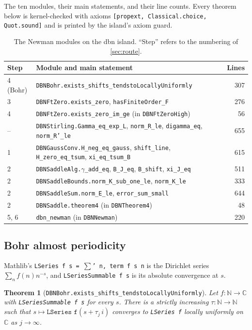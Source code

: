 \documentclass[11pt]{article}
\newtheorem{theorem}{Theorem}
\theoremstyle{definition}
\newcommand{\lean}[1]{\texttt{#1}}
\newcommand{\C}{\mathbb{C}}
\newcommand{\N}{\mathbb{N}}
\begin{document}
The ten modules, their main statements, and their line counts. Every theorem below is kernel-checked with axioms \lean{[propext, Classical.choice, Quot.sound]} and is printed by the island's axiom guard.

\begin{table}[h]\centering\small
\begin{tabular}{@{}llr@{}}
\toprule
Step & Module and main statement & Lines \\
\midrule
4 (Bohr) & \lean{DBNBohr.exists\_shifts\_tendstoLocallyUniformly} & 307 \\
3 & \lean{DBNFtZero.exists\_zero}, \lean{hasFiniteOrder\_F} & 276 \\
4 & \lean{DBNFtZero.exists\_zero\_im\_ge} (in \lean{DBNFtZeroHigh}) & 56 \\
-- & \lean{DBNStirling.Gamma\_eq\_exp\_L}, \lean{norm\_R\_le}, \lean{digamma\_eq}, \lean{norm\_R'\_le} & 655 \\
1 & \lean{DBNGaussConv.H\_neg\_eq\_gauss}, \lean{shift\_line}, \lean{H\_zero\_eq\_tsum}, \lean{xi\_eq\_tsum\_B} & 615 \\
2 & \lean{DBNSaddleAlg.$\gamma$\_add\_eq}, \lean{B\_J\_eq}, \lean{B\_shift}, \lean{xi\_J\_eq} & 511 \\
2 & \lean{DBNSaddleBounds.norm\_K\_sub\_one\_le}, \lean{norm\_K\_le} & 333 \\
2 & \lean{DBNSaddleSum.norm\_E\_le}, \lean{error\_sum\_small} & 644 \\
2 & \lean{DBNSaddle.theorem4} (in \lean{DBNTheorem4}) & 48 \\
5, 6 & \lean{dbn\_newman} (in \lean{DBNNewman}) & 220 \\
\bottomrule
\end{tabular}
\caption{The Newman modules on the dbn island. ``Step'' refers to the numbering of \cref{sec:route}.}
\end{table}

\subsection{Bohr almost periodicity}\label{sec:bohr}

Mathlib's \lean{LSeries f s = $\sum$' n, term f s n} is the Dirichlet series $\sum_n f(n)n^{-s}$, and \lean{LSeriesSummable f s} is its absolute convergence at $s$.

\begin{theorem}[\lean{DBNBohr.exists\_shifts\_tendstoLocallyUniformly}]
Let $f : \N \to \C$ with \lean{LSeriesSummable f s} for every $s$. There is a strictly increasing $\tau : \N \to \N$ such that $s \mapsto \lean{LSeries f}(s + \tau_j\, i)$ converges to \lean{LSeries f} locally uniformly on $\C$ as $j \to \infty$.
\end{theorem}
\end{document}
